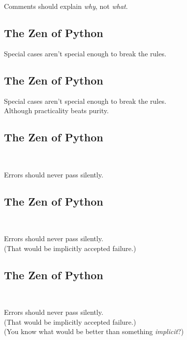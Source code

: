 \documentclass[xga]{xdvislides}
\begin{document}
Comments should explain {\em why}, not {\em what}. \\

\subsection{The Zen of Python}
\begin{center}
    Special cases aren't special enough to break the rules.
\end{center}

\subsection{The Zen of Python}
\begin{center}
    Special cases aren't special enough to break the rules. \\
\addvspace{.5in}
    Although practicality beats purity.
\end{center}

\subsection{The Zen of Python}
\\
\begin{center}
    Errors should never pass silently.
\end{center}

\subsection{The Zen of Python}
\\
\begin{center}
    Errors should never pass silently. \\
\addvspace{.2in}
	\small
	(That would be implicitly accepted failure.)
\end{center}
\Huge

\subsection{The Zen of Python}
\\
\begin{center}
    Errors should never pass silently. \\
\addvspace{.2in}
	\small
	(That would be implicitly accepted failure.) \\
\addvspace{.2in}
	(You know what would be better than something {\em implicit}?)
\end{center}
\end{document}
